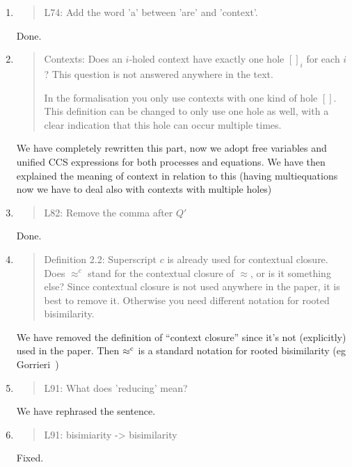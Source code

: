 \begin{enumerate}
\item \begin{quote}
    L74: Add the word 'a' between 'are' and 'context'.
  \end{quote}
  \Mark
  Done.
    
\item \begin{quote}
  Contexts: Does an $i$-holed context have exactly one hole $[]_i$ for
  each $i$? This question is not answered anywhere in the text.

  In the formalisation you only use contexts with one kind of hole $[]$. This definition can be changed to only
  use one hole as well, with a clear indication that this hole can occur multiple times.
\end{quote}

  \Mark
 We have completely rewritten this part, now we adopt free variables
and unified CCS expressions for both processes and equations.
We have then explained the meaning of context in relation to this 
(having multiequations now we have to deal also with contexts with multiple holes)

\item \begin{quote}
    L82: Remove the comma after $Q'$
  \end{quote}
   \Mark
 Done.
  
\item \begin{quote}
    Definition 2.2: Superscript $c$ is already used for contextual closure.
    Does $\approx^c$ stand for the contextual closure of $\approx$, or is it something else?
    Since contextual closure is not used anywhere in the paper, it is best to remove it.
    Otherwise you need different notation for rooted bisimilarity.
  \end{quote}
  \Mark
  We have removed the definition of ``context closure'' since it's not
  (explicitly) used in the paper.  Then $\mathrel{\approx^{\rm{c}}}$ is a standard
  notation for rooted bisimilarity (eg  Gorrieri~\cite{Gorrieri:2015jt})

  
\item \begin{quote}
    L91: What does 'reducing' mean?
  \end{quote}
  \Mark
 We have rephrased the sentence.

\item \begin{quote}
    L91: bisimiarity -> bisimilarity
  \end{quote}
   \Mark
 Fixed.


\end{enumerate}
